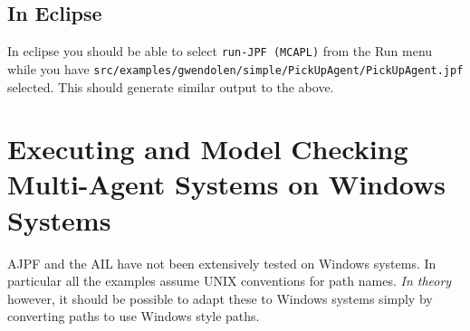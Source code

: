 \subsection{In Eclipse}

In eclipse you should be able to select \texttt{run-JPF (MCAPL)} from the Run menu while you have \texttt{src/examples/gwendolen/simple/PickUpAgent/PickUpAgent.jpf} selected.  This should generate similar output to the above.

\section{Executing and Model Checking Multi-Agent Systems on Windows Systems}

AJPF and the AIL have not been extensively tested on Windows systems.  In particular all the examples assume UNIX conventions for path names.  \emph{In theory} however, it should be possible to adapt these to Windows systems simply by converting paths to use Windows style paths.
